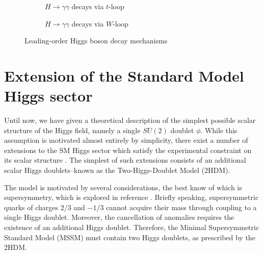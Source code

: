 \begin{figure}[h!]
\begin{subfigure}[b]{0.48\textwidth}
        \caption{$H\rightarrow \gamma\gamma$ decays via $t$-loop}
        \label{subfig:H-yy-t}
    \end{subfigure}
    \begin{subfigure}[b]{0.48\textwidth}
        \centering
        \caption{$H\rightarrow \gamma\gamma$ decays via $W$-loop}
        \label{subfig:hyy-W}
    \end{subfigure}
    \caption{Leading-order Higgs boson decay mechanisms}
    \label{fig:higgs-decays}
\end{figure} 

\section{Extension of the Standard Model Higgs sector}
\label{sect:introduce-2HDM}

Until now, we have given a theoretical description of the simplest possible scalar structure of the Higgs field, namely a single $SU(2)$ doublet $\phi$. 
While this assumption is motivated almost entirely by simplicity, there exist a number of extensions to the SM Higgs sector which satisfy the experimental constraint on its scalar structure \cite{Zyla:2020zbs}. 
The simplest of such extensions consists of an additional scalar Higgs doublets--known as the Two-Higgs-Doublet Model (2HDM). 

The model is motivated by several considerations, the best know of which is supersymmetry, which is explored in reference \cite{HABER198575}. 
Briefly speaking, supersymmetric quarks of charges $2/3$ and $-1/3$ cannot acquire their mass through coupling to a single Higgs doublet. 
Moreover, the cancellation of anomalies requires the existence of an additional Higgs doublet. 
Therefore, the Minimal Supersymmetric Standard Model (MSSM) must contain two Higgs doublets, as prescribed by the 2HDM.


